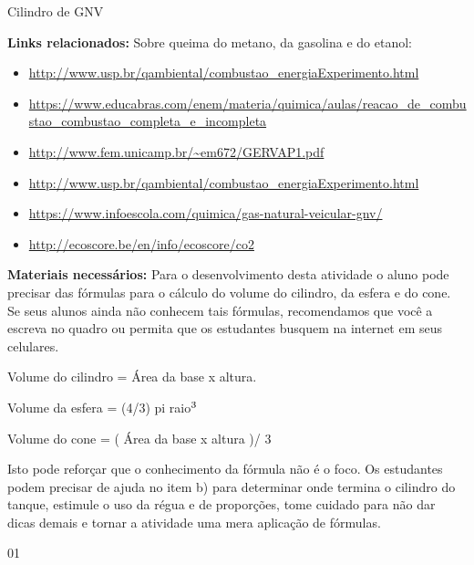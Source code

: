 \begin{sugestions}{Cilindro de GNV}
{
\textbf{Links relacionados:} Sobre queima do metano, da gasolina e do etanol:
\begin{itemize}
\item {} 
\url{http://www.usp.br/qambiental/combustao\_energiaExperimento.html}

\item {} 
\url{https://www.educabras.com/enem/materia/quimica/aulas/reacao\_de\_combustao\_combustao\_completa\_e\_incompleta}

\item {} 
\url{http://www.fem.unicamp.br/~em672/GERVAP1.pdf}

\item {} 
\url{http://www.usp.br/qambiental/combustao\_energiaExperimento.html}

\item {} 
\url{https://www.infoescola.com/quimica/gas-natural-veicular-gnv/}

\item {} 
\url{http://ecoscore.be/en/info/ecoscore/co2}

\end{itemize}

\textbf{Materiais necessários:} Para o desenvolvimento desta atividade o aluno pode precisar das fórmulas para o cálculo do volume do cilindro, da esfera e do cone. Se seus alunos ainda não conhecem tais fórmulas, recomendamos que você a escreva no quadro ou permita que os estudantes busquem na internet em seus celulares.

Volume do cilindro = Área da base x altura.

Volume da esfera = (4/3) pi raio\(\sp{\text{3}}\)

Volume do cone = ( Área da base x altura )/ 3

Isto pode reforçar que o conhecimento da fórmula não é o foco. Os estudantes podem precisar de ajuda no item b) para determinar onde termina o cilindro do tanque, estimule o uso da régua e de proporções, tome cuidado para não dar dicas demais e tornar a atividade uma mera aplicação de fórmulas.
}{0}{1}
\end{sugestions}
